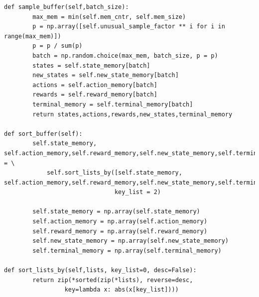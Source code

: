 \documentclass[ %
                    author={Ashwinder Khurana},
                supervisor={Prof Dave Cliff},
                    degree={MEng},
                     title={The Deeply Reinforced Trader},
                  subtitle={},
                      type={enterprise},
                      year={2020} ]{dissertation}
\begin{document}
{\begin{lstlisting}[label=sparse rewards, caption = Sampling experiences with a probability factor]
def sample_buffer(self,batch_size):
        max_mem = min(self.mem_cntr, self.mem_size)
        p = np.array([self.unusual_sample_factor ** i for i in range(max_mem)])
        p = p / sum(p)
        batch = np.random.choice(max_mem, batch_size, p = p)
        states = self.state_memory[batch]
        new_states = self.new_state_memory[batch]
        actions = self.action_memory[batch]
        rewards = self.reward_memory[batch]
        terminal_memory = self.terminal_memory[batch] 
        return states,actions,rewards,new_states,terminal_memory

def sort_buffer(self):
        self.state_memory, self.action_memory,self.reward_memory,self.new_state_memory,self.terminal_memory = \
            self.sort_lists_by([self.state_memory, 	 self.action_memory,self.reward_memory,self.new_state_memory,self.terminal_memory],
                               key_list = 2)

        self.state_memory = np.array(self.state_memory)
        self.action_memory = np.array(self.action_memory)
        self.reward_memory = np.array(self.reward_memory)
        self.new_state_memory = np.array(self.new_state_memory)
        self.terminal_memory = np.array(self.terminal_memory) 
        
def sort_lists_by(self,lists, key_list=0, desc=False):
        return zip(*sorted(zip(*lists), reverse=desc,
                 key=lambda x: abs(x[key_list])))
\end{lstlisting}

}
\end{document}
